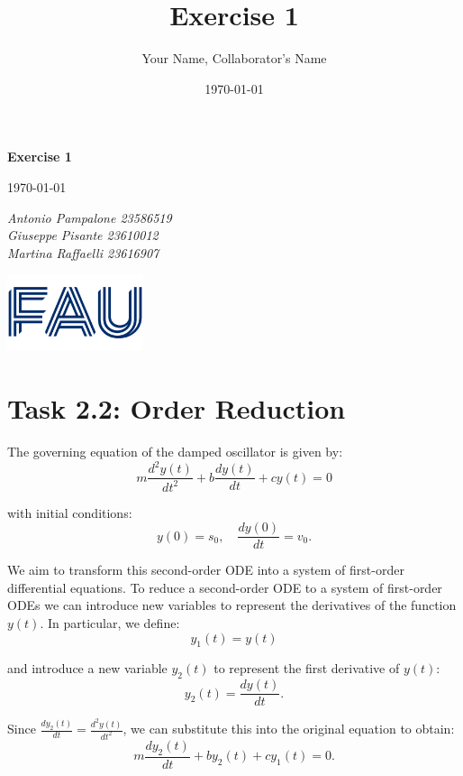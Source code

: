 \documentclass{article}
\title{Exercise 1}
\author{Your Name, Collaborator's Name}
\date{\today}
\begin{document}
\begin{titlepage}
    \centering
    \vspace*{1in}
    
    {\Huge\bfseries Exercise 1\par}
    \vspace{1.5cm}
    {\Large \today\par}
    \vspace{1.5cm}
    {\Large\itshape Antonio Pampalone 23586519 \\ Giuseppe Pisante 23610012\\ Martina Raffaelli 23616907 \par}
    
    \vfill
    \includegraphics[width=0.3\textwidth]{FAU-Logo.png}\par\vspace{1cm} %
   
\end{titlepage}

\newpage
\small

\section*{Task 2.2: Order Reduction}

The governing equation of the damped oscillator is given by:
\begin{equation}
m \frac{d^2 y(t)}{dt^2} + b \frac{dy(t)}{dt} + c y(t) = 0
\end{equation}

with initial conditions:
\[
y(0) = s_0, \quad \frac{dy(0)}{dt} = v_0.
\]

We aim to transform this second-order ODE into a system of first-order differential equations. To reduce a second-order ODE to a 
system of first-order ODEs we can introduce new variables to represent the derivatives of the function \( y(t) \). 
In particular, we define:
\[
y_1(t) = y(t)
\]

and introduce a new variable \( y_2(t) \) to represent the first derivative of \( y(t) \):
\[
y_2(t) = \frac{dy(t)}{dt}.
\]

Since \( \frac{dy_2(t)}{dt} = \frac{d^2 y(t)}{dt^2} \), we can substitute this into the original equation to obtain:
\begin{equation}
m \frac{dy_2(t)}{dt} + b y_2(t) + c y_1(t) = 0.
\end{equation}
\end{document}
